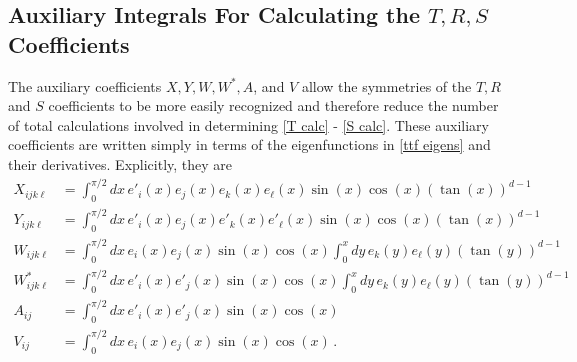 \documentclass[../PhD.tex]{subfiles}
\begin{document}
\begin{subappendices}
\section{Auxiliary Integrals For Calculating the $T, R, S$ Coefficients}
\label{app: integrals}

The auxiliary coefficients $X, Y, W, W^*, A$, and $V$ allow the symmetries of the $T, R$ and $S$ coefficients to be more easily recognized and therefore reduce the number of total calculations involved in determining \eqref{T calc} - \eqref{S calc}. These auxiliary coefficients are written simply in terms of the eigenfunctions in \eqref{ttf eigens} and their derivatives. Explicitly, they are
\begin{align}
\label{X int}
X_{ijk\ell} &= \int^{\pi/2}_0 dx \, e'_i(x) e_j(x) e_k(x) e_\ell(x) \sin(x) \cos(x) \left( \tan(x) \right)^{d-1} \\
\label{Y int}
Y_{ijk\ell} &= \int^{\pi/2}_0 dx \, e'_i(x) e_j(x) e'_k(x) e'_\ell(x) \sin(x) \cos(x) \left( \tan(x) \right)^{d-1} \\
\label{W int}
W_{ijk\ell} &= \int^{\pi/2}_0 dx \, e_i(x) e_j(x) \sin(x) \cos(x) \int^x_0 dy \, e_k(y) e_\ell(y) \left( \tan(y) \right)^{d-1} \\
\label{W* int}
W^*_{ijk\ell} &= \int^{\pi/2}_0 dx \, e'_i(x) e'_j(x) \sin(x) \cos(x) \int^x_0 dy \, e_k(y) e_\ell(y) \left( \tan(y) \right)^{d-1} \\
\label{A int}
A_{ij} &= \int^{\pi/2}_0 dx \, e'_i(x) e'_j(x) \sin(x) \cos(x) \\
\label{V int}
V_{ij} &= \int^{\pi/2}_0 dx \, e_i(x) e_j(x) \sin(x) \cos(x) \, .
\end{align}


\end{subappendices}
\end{document}
